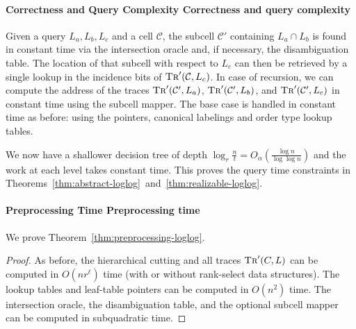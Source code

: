 \paragraph*{\iftitlecase%
Correctness and Query Complexity\else%
Correctness and query complexity\fi}
Given a query \(L_a, L_b, L_c\) and a cell \(\mathcal{C}\),
the subcell \(\mathcal{C}'\) containing \(L_a \cap L_b\) is found in constant
time via the
intersection oracle and, if necessary, the disambiguation table.
The location of that subcell with respect to \(L_c\) can then be retrieved by
a single lookup in the incidence bits of \(\textsc{Tr}'(\mathcal{C}, L_c)\).
In case of recursion, we can compute the address of the traces
\(\textsc{Tr}'(\mathcal{C}', L_a)\),
\(\textsc{Tr}'(\mathcal{C}', L_b)\), and
\(\textsc{Tr}'(\mathcal{C}', L_c)\) in constant time using the subcell mapper.
The base case is handled in constant time as before: using the pointers,
canonical labelings and order type lookup tables.

We now have a shallower decision tree of depth
\(\log_r{\frac{n}{t}} = O_\alpha(\frac{\log{n}}{\log{\log{n}}})\)
and the work at each level takes constant time.
This proves the query time constraints in
Theorems~\ref{thm:abstract-loglog}~and~\ref{thm:realizable-loglog}.

\paragraph*{\iftitlecase%
Preprocessing Time\else%
Preprocessing time\fi}
We prove Theorem~\ref{thm:preprocessing-loglog}.
\begin{proof}
  As before, the hierarchical cutting and all traces \(\textsc{Tr}'(C, L)\)
  can be computed in \(O(nr^\ell)\) time (with or without rank-select data
  structures). The lookup tables and leaf-table pointers can be computed in
  \(O(n^2)\) time. The intersection oracle, the disambiguation table, and the
  optional subcell mapper can be computed in subquadratic time.
\end{proof}
